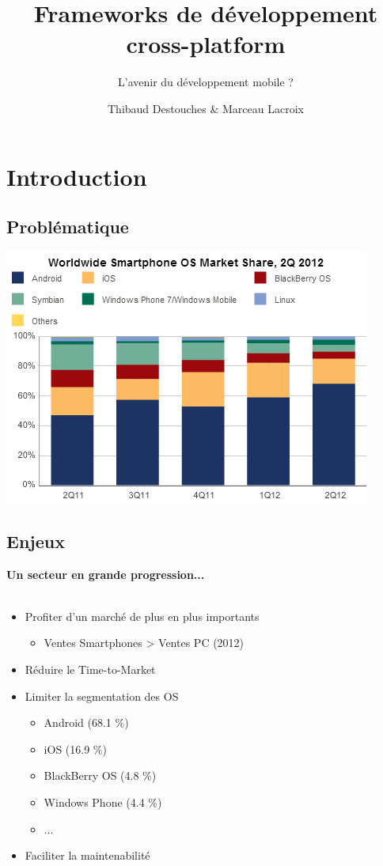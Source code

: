 \documentclass{beamer}
\title{Frameworks de développement cross-platform}
\subtitle{L'avenir du développement mobile ?}
\author{Thibaud Destouches \& Marceau Lacroix}
\date{}
\institute{ISTIC -- Université de Rennes 1}
\begin{document}
\begin{frame}[fragile]
\titlepage
\end{frame}

\begin{frame}
\setcounter{tocdepth}{2}
\tableofcontents
\end{frame}

\section{Introduction}
\subsection{Problématique}

\begin{frame}
  \includegraphics[scale=0.9]{segm}
\end{frame}

\subsection{Enjeux}

\begin{frame}
\textbf{Un secteur en grande progression...}
\\ ~ \\
  \begin{itemize}
    \item Profiter d'un marché de plus en plus importants
    \begin{itemize}
      \item Ventes Smartphones > Ventes PC (2012)
    \end{itemize}
    \item Réduire le Time-to-Market
    \item Limiter la segmentation des OS
    \begin{itemize}
      \item Android (68.1 \%)
      \item iOS (16.9 \%)
      \item BlackBerry OS (4.8 \%)
      \item Windows Phone (4.4 \%)
      \item ...
    \end{itemize}
    \item Faciliter la maintenabilité
  \end{itemize}
\end{frame}
\end{document}
